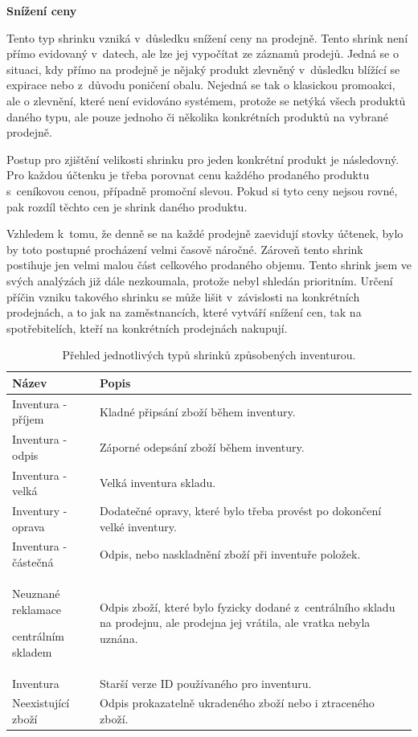\textbf{Snížení ceny}
 
Tento typ shrinku vzniká v~důsledku snížení ceny na prodejně. Tento shrink není přímo evidovaný v~datech, ale lze jej vypočítat ze záznamů prodejů. Jedná se o situaci, kdy přímo na prodejně je nějaký produkt zlevněný v~důsledku blížící se expirace nebo z~důvodu poničení obalu. Nejedná se tak o klasickou promoakci, ale o zlevnění, které není evidováno systémem, protože se netýká všech produktů daného typu, ale pouze jednoho či několika konkrétních produktů na vybrané prodejně.

Postup pro zjištění velikosti shrinku pro jeden konkrétní produkt je následovný. Pro každou účtenku je třeba porovnat cenu každého prodaného produktu s~ceníkovou cenou, případně promoční slevou. Pokud si tyto ceny nejsou rovné, pak rozdíl těchto cen je shrink daného produktu.

Vzhledem k~tomu, že denně se na každé prodejně zaevidují stovky účtenek, bylo by toto postupné procházení velmi časově náročné. Zároveň tento shrink postihuje jen velmi malou část celkového prodaného objemu. Tento shrink jsem ve svých analýzách již dále nezkoumala, protože nebyl shledán prioritním. Určení příčin vzniku takového shrinku se může lišit v~závislosti na konkrétních prodejnách, a to jak na zaměstnancích, které vytváří snížení cen, tak na spotřebitelích, kteří na konkrétních prodejnách nakupují.

\begin{table}[hbtp!]
    \caption{Přehled jednotlivých typů shrinků  způsobených inventurou.}
    \label{tab:sh:inv}
    \begin{tabular}{ p{4cm} p{10.5cm}}
     Název             & Popis \\
    \hline
              Inventura - příjem           & Kladné připsání zboží během inventury.      \\
              Inventura - odpis           & Záporné odepsání zboží během inventury.      \\
              Inventura - velká             & Velká inventura skladu.     \\
              Inventury - oprava       & Dodatečné opravy, které bylo třeba provést po dokončení velké inventury.      \\
              Inventura - částečná    & Odpis, nebo naskladnění zboží při inventuře položek.      \\
              Neuznané reklamace \par centrálním skladem  \strut &  Odpis zboží, které bylo fyzicky dodané z~centrálního skladu na prodejnu, ale prodejna jej vrátila, ale vratka nebyla uznána.     \\
              Inventura              & Starší verze ID používaného pro inventuru.\\
              Neexistující zboží     & Odpis prokazatelně ukradeného zboží nebo i ztraceného zboží.      \\
    \end{tabular}
\end{table}

